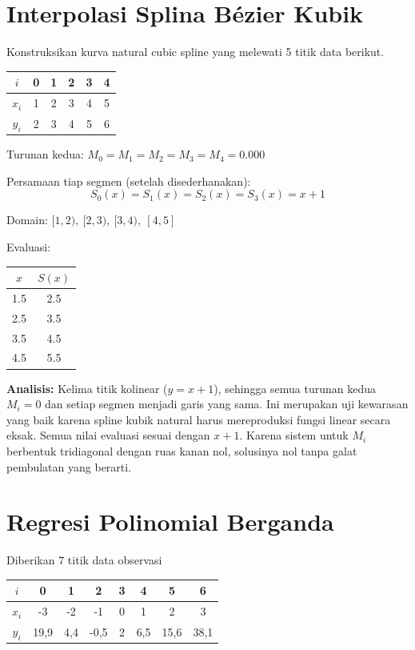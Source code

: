\documentclass[12pt,a4paper]{report}
\begin{document}
\section{Interpolasi Splina Bézier Kubik}
 
Konstruksikan kurva natural cubic spline yang melewati 5 titik data berikut.
 
 
\begin{center}
\begin{tabular}{|c|c|c|c|c|c|}
    \hline
    $i$ & 0 & 1 & 2 & 3 & 4 \\
    \hline
    $x_i$ & 1 & 2 & 3 & 4 & 5 \\
    \hline
    $y_i$ & 2 & 3 & 4 & 5 & 6 \\
    \hline
\end{tabular}
\end{center}

Turunan kedua:
$M_0 = M_1 = M_2 = M_3 = M_4 = 0.000$

Persamaan tiap segmen (setelah disederhanakan):
\[
S_0(x) = S_1(x) = S_2(x) = S_3(x) = x + 1
\]

Domain:
$[1,2),\ [2,3),\ [3,4),\ [4,5]$

Evaluasi:
\begin{center}
\begin{tabular}{|c|c|}
\hline
$x$ & $S(x)$ \\
\hline
1.5 & 2.5 \\
2.5 & 3.5 \\
3.5 & 4.5 \\
4.5 & 5.5 \\
\hline
\end{tabular}
\end{center}

\textbf{Analisis:} Kelima titik kolinear ($y=x+1$), sehingga semua turunan kedua $M_i=0$ dan setiap segmen menjadi garis yang sama. Ini merupakan uji kewarasan yang baik karena spline kubik natural harus mereproduksi fungsi linear secara eksak. Semua nilai evaluasi sesuai dengan $x+1$. Karena sistem untuk $M_i$ berbentuk tridiagonal dengan ruas kanan nol, solusinya nol tanpa galat pembulatan yang berarti.

\section{Regresi Polinomial Berganda}

Diberikan 7 titik data observasi

\begin{center}
\begin{tabular}{|c|c|c|c|c|c|c|c|}
    \hline
    $i$ & 0 & 1 & 2 & 3 & 4 & 5 & 6\\
    \hline
    $x_i$ & -3 & -2 & -1 & 0 & 1 & 2 & 3 \\
    \hline
    $y_i$ & 19,9 & 4,4 & -0,5 & 2 & 6,5 & 15,6 & 38,1 \\
    \hline
\end{tabular}
\end{center}
\end{document}

